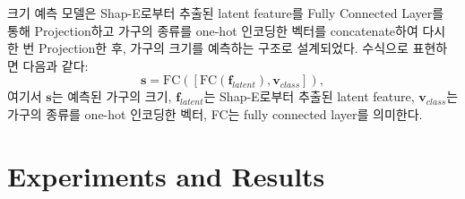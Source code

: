 \documentclass[11pt]{article}
\begin{document}
크기 예측 모델은 Shap-E로부터 추출된 latent feature를 Fully Connected Layer를 통해 Projection하고 가구의 종류를 one-hot 인코딩한 벡터를 concatenate하여 다시 한 번 Projection한 후, 가구의 크기를 예측하는 구조로 설계되었다.
수식으로 표현하면 다음과 같다:
\begin{equation}
    \label{eq:size_prediction}
    \mathbf{s} = \text{FC}([\text{FC}(\mathbf{f}_{latent}), \mathbf{v}_{class}]) ,
\end{equation}
여기서 $\mathbf{s}$는 예측된 가구의 크기, $\mathbf{f}_{latent}$는 Shap-E로부터 추출된 latent feature, $\mathbf{v}_{class}$는 가구의 종류를 one-hot 인코딩한 벡터, FC는 fully connected layer를 의미한다.

\section{Experiments and Results}
\end{document}
